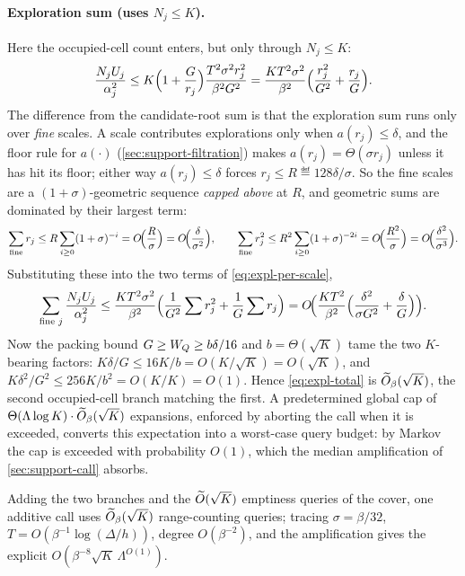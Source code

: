\paragraph{Exploration sum (uses $N_j\le K$).}
Here the occupied-cell count enters, but only through $N_j\le K$:
\begin{equation}\label{eq:expl-per-scale}
  \frac{N_jU_j}{\alpha_j^2}\le K\Bigl(1+\frac G{r_j}\Bigr)\frac{T^2\sigma^2 r_j^2}{\beta^2 G^2}
   = \frac{KT^2\sigma^2}{\beta^2}\Bigl(\frac{r_j^2}{G^2}+\frac{r_j}{G}\Bigr).
\end{equation}
The difference from the candidate-root sum is that the exploration sum runs only over \emph{fine} scales. A scale contributes explorations only when $a(r_j)\le\delta$, and the floor rule for
$a(\cdot)$ (\cref{sec:support-filtration}) makes $a(r_j)=\Theta(\sigma r_j)$ unless it has hit its floor;
either way $a(r_j)\le\delta$ forces $r_j\le R\eqdef 128\delta/\sigma$. So the fine scales are a
$(1+\sigma)$-geometric sequence \emph{capped above} at $R$, and geometric sums are dominated by their
largest term:
\[
  \sum_{\text{fine}}r_j\le R\sum_{i\ge0}(1+\sigma)^{-i}=O\!\Bigl(\frac R\sigma\Bigr)=O\!\Bigl(\frac
   {\delta}{\sigma^2}\Bigr),\qquad
  \sum_{\text{fine}}r_j^2\le R^2\sum_{i\ge0}(1+\sigma)^{-2i}=O\!\Bigl(\frac{R^2}\sigma\Bigr)=O\!\Bigl(\frac
   {\delta^2}{\sigma^3}\Bigr).
\]
Substituting these into the two terms of \eqref{eq:expl-per-scale},
\begin{equation}\label{eq:expl-total}
  \sum_{\text{fine }j}\frac{N_jU_j}{\alpha_j^2}
   \le\frac{KT^2\sigma^2}{\beta^2}\Bigl(\frac1{G^2}\sum r_j^2+\frac1G\sum r_j\Bigr)
   = O\!\Bigl(\frac{KT^2}{\beta^2}\Bigl(\frac{\delta^2}{\sigma G^2}+\frac{\delta}{G}\Bigr)\Bigr).
\end{equation}
Now the packing bound $G\ge W_Q\ge b\delta/16$ and $b=\Theta(\sqrt K)$ tame the two $K$-bearing factors:
$K\delta/G\le 16K/b=O(K/\sqrt K)=O(\sqrt K)$, and $K\delta^2/G^2\le 256K/b^2=O(K/K)=O(1)$. Hence
\eqref{eq:expl-total} is $\widetilde{O}_\beta(\sqrt K)$, the second occupied-cell branch matching the first.
A predetermined global cap of $\Theta(\Lambda\log K)\cdot\widetilde{O}_\beta(\sqrt K)$ expansions, enforced by
aborting the call when it is exceeded, converts this expectation into a worst-case query budget: by Markov
the cap is exceeded with probability $O(1)$, which the median amplification of \cref{sec:support-call}
absorbs.

Adding the two branches and the $\widetilde{O}(\sqrt K)$ emptiness queries of the cover, one additive call uses
$\widetilde{O}_\beta(\sqrt K)$ range-counting queries; tracing $\sigma=\beta/32$, $T=O(\beta^{-1}\log(\Delta/h))$,
degree $O(\beta^{-2})$, and the amplification gives the explicit $O(\beta^{-8}\sqrt K\,\Lambda^{O(1)})$.

